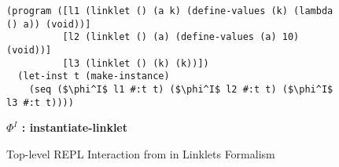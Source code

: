 

\begin{figure}[!htbp]
\centering
\small
\begin{minipage}{\textwidth}
\begin{lstlisting}[mathescape]
(program ([l1 (linklet () (a k) (define-values (k) (lambda () a)) (void))]
          [l2 (linklet () (a) (define-values (a) 10) (void))]
          [l3 (linklet () (k) (k))])
  (let-inst t (make-instance)
    (seq ($\phi^I$ l1 #:t t) ($\phi^I$ l2 #:t t) ($\phi^I$ l3 #:t t))))
\end{lstlisting}
\begin{center}
    \textbf{
      $\Phi^I$ : instantiate-linklet
    }
  \end{center}
\end{minipage}
\caption{Top-level REPL Interaction from  in Linklets Formalism}
\label{fig:toplevel-example-repl-interactions-formal}
\end{figure}


